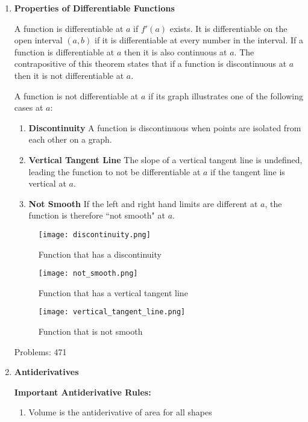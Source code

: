 \documentclass{article}
\begin{document}
\begin{enumerate}

\item \textbf{Properties of Differentiable Functions}

A function is differentiable at $a$ if $f'(a)$ exists. It is differentiable on the open interval $(a, b)$ if it is differentiable at every number in the interval. If a function is differentiable at $a$ then it is also continuous at $a$. The contrapositive of this theorem states that if a function is discontinuous at $a$ then it is not differentiable at $a$.

A function is not differentiable at $a$ if its graph illustrates one of the following cases at $a$:

\begin{enumerate}
    \item \textbf{Discontinuity}
    A function is discontinuous when points are isolated from each other on a graph.
    
    \item \textbf{Vertical Tangent Line}
    The slope of a vertical tangent line is undefined, leading the function to not be differentiable at $a$ if the tangent line is vertical at $a$. 
    
    \item \textbf{Not Smooth}
    If the left and right hand limits are different at $a$, the function is therefore ``not smooth" at $a$. 
\end{enumerate}

\begin{figure}[H]
  \texttt{[image: discontinuity.png]}
  \caption{Function that has a discontinuity}\label{fig:awesome_image1}
\endminipage\hfill
{}
  \texttt{[image: not\_smooth.png]}
  \caption{Function that has a vertical tangent line}\label{fig:awesome_image2}
\endminipage\hfill
{}%
  \texttt{[image: vertical\_tangent\_line.png]}
  \caption{Function that is not smooth}\label{fig:awesome_image3}
\endminipage
\end{figure}

Problems: 471

\item \textbf{Antiderivatives}

\textbf{Important Antiderivative Rules:}
\begin{enumerate}
    \item Volume is the antiderivative of area for all shapes
\end{enumerate}


\end{enumerate}
\end{document}
